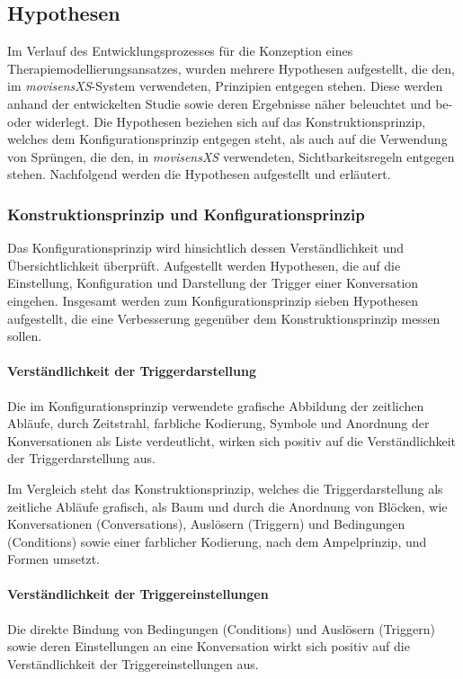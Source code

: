 \subsection{Hypothesen}
Im Verlauf des Entwicklungsprozesses für die Konzeption eines Therapiemodellierungsansatzes, wurden mehrere Hypothesen aufgestellt, die den, im \emph{movisensXS}-System verwendeten, Prinzipien entgegen stehen. Diese werden anhand der entwickelten Studie sowie deren Ergebnisse näher beleuchtet und be- oder widerlegt. Die Hypothesen beziehen sich auf das Konstruktionsprinzip, welches dem Konfigurationsprinzip entgegen steht, als auch auf die Verwendung von Sprüngen, die den, in \emph{movisensXS} verwendeten, Sichtbarkeitsregeln entgegen stehen. Nachfolgend werden die Hypothesen aufgestellt und erläutert.

\subsubsection{Konstruktionsprinzip und Konfigurationsprinzip}

Das Konfigurationsprinzip wird hinsichtlich dessen Verständlichkeit und Übersichtlichkeit überprüft. Aufgestellt werden Hypothesen, die auf die Einstellung, Konfiguration und Darstellung der Trigger einer Konversation eingehen. Insgesamt werden zum Konfigurationsprinzip sieben Hypothesen aufgestellt, die eine Verbesserung gegenüber dem Konstruktionsprinzip messen sollen.

\paragraph{Verständlichkeit der Triggerdarstellung}
Die im Konfigurationsprinzip verwendete grafische Abbildung der zeitlichen Abläufe, durch Zeitstrahl, farbliche Kodierung, Symbole und Anordnung der Konversationen als Liste verdeutlicht, wirken sich positiv auf die Verständlichkeit der Triggerdarstellung aus. 

Im Vergleich steht das Konstruktionsprinzip, welches die Triggerdarstellung als zeitliche Abläufe grafisch, als Baum und durch die Anordnung von Blöcken, wie Konversationen (Conversations), Auslösern (Triggern) und Bedingungen (Conditions) sowie einer farblicher Kodierung, nach dem Ampelprinzip, und Formen umsetzt.


\paragraph{Verständlichkeit der Triggereinstellungen}
Die direkte Bindung von Bedingungen (Conditions) und Auslösern (Triggern) sowie deren Einstellungen an eine Konversation wirkt sich positiv auf die Verständlichkeit der Triggereinstellungen aus. 

